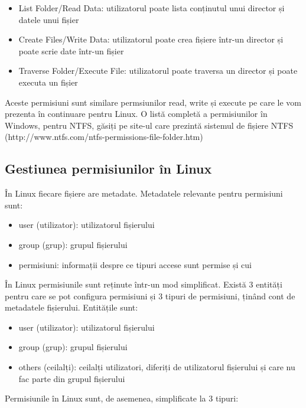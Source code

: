 \begin{itemize}
	\item List Folder/Read Data: utilizatorul poate lista conținutul unui
		director și datele unui fișier
	\item Create Files/Write Data: utilizatorul poate crea fișiere într-un
		director și poate scrie date într-un fișier
	\item Traverse Folder/Execute File: utilizatorul poate traversa un
		director și poate executa un fișier
\end{itemize}

Aceste permisiuni sunt similare permsiunilor read, write și execute pe care le
vom prezenta în continuare pentru Linux. O listă completă a permisiunilor în
Windows, pentru NTFS, găsiți pe site-ul care prezintă sistemul de fișiere NTFS
(http://www.ntfs.com/ntfs-permissions-file-folder.htm)

\subsection{Gestiunea permisiunilor în Linux}
\label{sec:users-fs-perms-linux}

În Linux fiecare fișiere are metadate. Metadatele relevante pentru permisiuni sunt:

\begin{itemize}
	\item user (utilizator): utilizatorul fișierului
	\item group (grup): grupul fișierului
	\item permisiuni: informații despre ce tipuri accese sunt permise și cui
\end{itemize}

În Linux permisiunile sunt reținute într-un mod simplificat. Există 3 entități
pentru care se pot configura permisiuni și 3 tipuri de permisiuni, ținând cont
de metadatele fișierului. Entitățile sunt:

\begin{itemize}
	\item user (utilizator): utilizatorul fișierului
	\item group (grup): grupul fișierului
	\item others (ceilalți): ceilalți utilizatori, diferiți de utilizatorul
		fișierului și care nu fac parte din grupul fișierului
\end{itemize}

Permisiunile în Linux sunt, de asemenea, simplificate la 3 tipuri:

